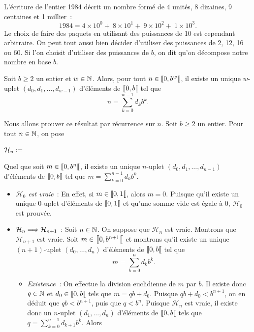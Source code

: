 \documentclass{magnoliaold}
\begin{document}
L'écriture de l'entier 1984 décrit un nombre formé de 4 unités, 8 dizaines, 9 centaines
et 1 millier~:
\[1984 = 4\times 10^0 +\ 8\times 10^1 + \ 9 \times 10^2 + \ 1\times 10^3.\]
Le choix de faire des paquets en utilisant des puissances de 10 est cependant arbitraire.
On peut tout aussi bien décider d'utiliser des puissances de 2, 12, 16 ou 60. Si l'on choisit
d'utiliser des puissances de $b$, on dit qu'on décompose notre nombre en base $b$.

\begin{proposition}
Soit $b\geq 2$ un entier et $w\in\mathbb{N}$. Alors, pour tout $n\in\left\llbracket 0,b^w\right\llbracket$, il existe un unique $w$-uplet $(d_0,d_1,\ldots,d_{w-1})$ d'éléments de $\left\llbracket 0,b\right\llbracket$ tel que
\[n=\sum_{k=0}^{w-1} d_k b^k.\]
\end{proposition}

\begin{preuve}
Nous allons prouver ce résultat par récurrence sur $n$. Soit $b\geq 2$ un entier. Pour tout $n\in\mathbb{N}$, on pose
\begin{center}
$\mathcal{H}_n\coloneqq$ \og
\begin{minipage}[t]{0.6\linewidth}
Quel que soit $m\in\left\llbracket 0,b^n\right\llbracket$, il existe un unique $n$-uplet $(d_0,d_1,\ldots,d_{n-1})$ d'éléments de $\left\llbracket 0,b\right\llbracket$ tel que
$m=\sum_{k=0}^{n-1} d_k b^k$.\fg
\end{minipage}
\end{center}
\begin{itemize}
\item \emph{$\mathcal{H}_0$ est vraie}~: En effet, si $m\in\left\llbracket 0,1\right\llbracket$, alors $m=0$. Puisque qu'il existe un unique $0$-uplet d'éléments de $\left\llbracket 0,1\right\llbracket$ et qu'une somme vide est égale à 0, $\mathcal{H}_0$ est prouvée.
\item $\mathcal{H}_n\Longrightarrow\mathcal{H}_{n+1}$~: Soit $n\in\mathbb{N}$. On suppose que $\mathcal{H}_n$ est vraie. Montrons que $\mathcal{H}_{n+1}$ est vraie. Soit $m\in\left\llbracket 0,b^{n+1}\right\llbracket$ et montrons qu'il existe un unique $(n+1)$-uplet $(d_0,\ldots,d_n)$ d'éléments de $\left\llbracket 0,b\right\llbracket$ tel que
\[m=\sum_{k=0}^{n} d_k b^k.\]
\begin{itemize}
\item \emph{Existence~:} On effectue la division euclidienne de $m$ par $b$. Il existe donc $q\in\mathbb{N}$ et $d_0\in\left\llbracket 0,b\right\llbracket$ tels que $m=qb+d_0$. Puisque $qb+d_0< b^{n+1}$, on en déduit que $qb<b^{n+1}$, puis que $q<b^n$. Puisque $\mathcal{H}_n$ est vraie, il existe donc un $n$-uplet $(d_1,\ldots,d_n)$ d'éléments de $\left\llbracket 0,b\right\llbracket$ tels que $q=\sum_{k=0}^{n-1} d_{k+1} b^k$. Alors

\end{itemize}
\end{itemize}
\end{preuve}
\end{document}
